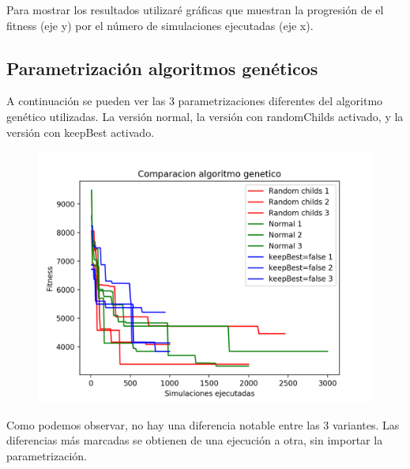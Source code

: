 \documentclass[a4paper, 11pt]{article}
\begin{document}
	Para mostrar los resultados utilizaré gráficas que muestran la progresión de el fitness (eje y) por el número de simulaciones ejecutadas (eje x). \\
	
	\subsection{Parametrización algoritmos genéticos}
		A continuación se pueden ver las 3 parametrizaciones diferentes del algoritmo genético utilizadas. La versión normal, la versión con randomChilds activado, y la versión con keepBest activado.  \\
		\begin{figure}[htb!]
			\begin{minipage}{0.8\textwidth}
				\centering
				\includegraphics[scale=1]{images/comparacion_gen}
				\label{fig:comparacion_gen}
			\end{minipage}\hfill
		\end{figure}

		Como podemos observar, no hay una diferencia notable entre las 3 variantes. Las diferencias más marcadas se obtienen de una ejecución a otra, sin importar la parametrización. 
\end{document}
